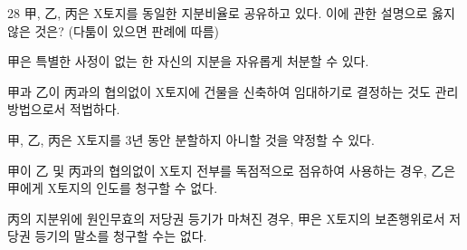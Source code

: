 \begin{question}{28}
甲, 乙, 丙은 X토지를 동일한 지분비율로 공유하고 있다. 이에 관한 설명으로 옳지 않은 것은? (다툼이 있으면 판례에 따름)
\begin{choices}
  \item 甲은 특별한 사정이 없는 한 자신의 지분을 자유롭게 처분할 수 있다.
  \item 甲과 乙이 丙과의 협의없이 X토지에 건물을 신축하여 임대하기로 결정하는 것도 관리 방법으로서 적법하다.
  \item 甲, 乙, 丙은 X토지를 3년 동안 분할하지 아니할 것을 약정할 수 있다.
  \item 甲이 乙 및 丙과의 협의없이 X토지 전부를 독점적으로 점유하여 사용하는 경우, 乙은 甲에게 X토지의 인도를 청구할 수 없다.
  \item 丙의 지분위에 원인무효의 저당권 등기가 마쳐진 경우, 甲은 X토지의 보존행위로서 저당권 등기의 말소를 청구할 수는 없다.
\end{choices}
\end{question}
